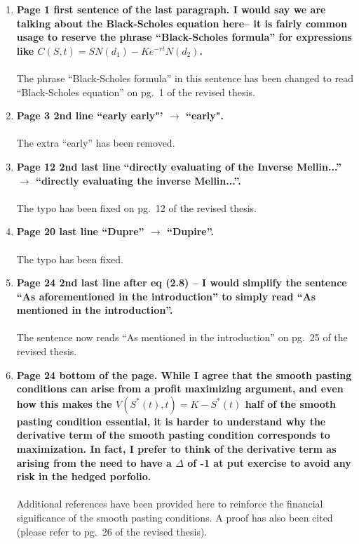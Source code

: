 \documentclass{article}
\begin{document}
\begin{enumerate}
    \item \textbf{Page 1 first sentence of the last paragraph. I would say we are talking about the Black-Scholes equation here-- it is fairly common usage to reserve the phrase ``Black-Scholes formula'' for expressions like $C(S,t) = SN(d_1) - Ke^{-rt}N(d_2)$.
    \\
    \\}
    The phrase ``Black-Scholes formula'' in this sentence has been changed to read ``Black-Scholes equation'' on pg.~1 of the revised thesis.
     \item \textbf{Page 3 2nd line ``early early"' $\rightarrow$ ``early".
    \\
    \\}
    The extra ``early'' has been removed.
     \item \textbf{Page 12 2nd last line ``directly evaluating of the Inverse Mellin...'' $\rightarrow$ ``directly evaluating the inverse Mellin...''.
    \\
    \\}
    The typo has been fixed on pg.~12 of the revised thesis.
     \item \textbf{Page 20 last line ``Dupre'' $\rightarrow$ ``Dupire''.
    \\
    \\}
    The typo has been fixed.
     \item \textbf{Page 24 2nd last line after eq (2.8) -- I would simplify the sentence ``As aforementioned in the introduction'' to simply read ``As mentioned in the introduction''.
    \\
    \\}
    The sentence now reads ``As mentioned in the introduction'' on pg.~25 of the revised thesis.
      \item \textbf{Page 24 bottom of the page. While I agree that the smooth pasting conditions can arise from a profit maximizing argument, and even how this makes the $V(S^*(t),t) = K - S^*(t)$ half of the smooth pasting condition essential, it is harder to understand why the derivative term of the smooth pasting condition corresponds to maximization. In fact, I prefer to think of the derivative term as arising from the need to have a $\Delta$ of -1 at put exercise to avoid any risk in the hedged porfolio. 
    \\
    \\}
    Additional references have been provided here to reinforce the financial significance of the smooth pasting conditions. A proof has also been cited (please refer to pg.~26 of the revised thesis).
    

\end{enumerate}
\end{document}
